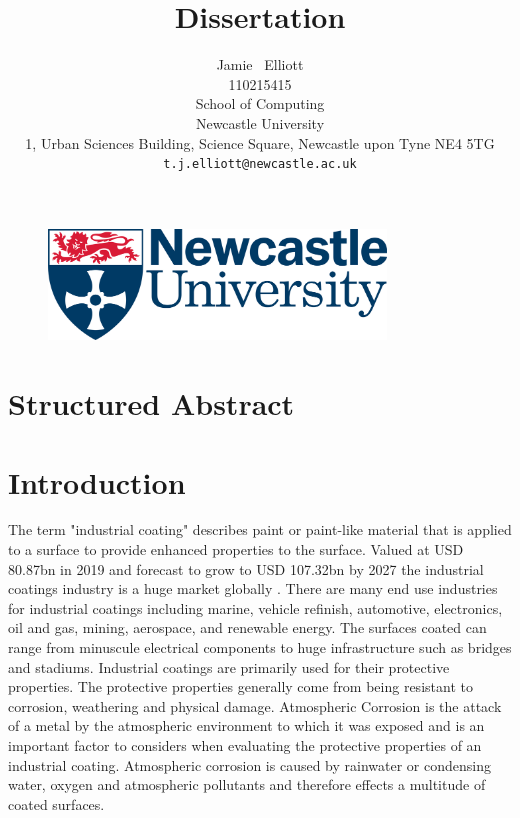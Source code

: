 \documentclass{article}
\title{Dissertation}
\author{
  Jamie ~Elliott \\
  110215415\\
  School of Computing\\
  Newcastle University\\
 1, Urban Sciences Building, Science Square, Newcastle upon Tyne NE4 5TG \\
  \texttt{t.j.elliott@newcastle.ac.uk} \\
}
\begin{document}
\begin{figure}[h]
    \centering
    \includegraphics[width=0.8\textwidth]{Newcastle_University_logo.png}
\end{figure}
\maketitle

\newpage
\section{Structured Abstract}

\section{Introduction}
The term "industrial coating" describes paint or paint-like material that is applied to a surface to provide enhanced properties to the surface. Valued at USD 80.87bn in 2019 and forecast to grow to USD 107.32bn by 2027 the industrial coatings industry is a huge market globally \citep{IndustrialCoatings2020}. There are many end use industries for industrial coatings including marine, vehicle refinish, automotive, electronics, oil and gas, mining, aerospace, and renewable energy.  The surfaces coated can range from minuscule electrical components to huge infrastructure such as bridges and stadiums. Industrial coatings are primarily used for their protective properties. The protective properties generally come from being resistant to corrosion, weathering and physical damage. Atmospheric Corrosion is the attack of a metal by the atmospheric environment to which it was exposed \citep{DelaFuente2011} and is an important factor to considers when evaluating the protective properties of an industrial coating. Atmospheric corrosion is caused by rainwater or condensing water, oxygen and atmospheric pollutants \citep{LeBozec2015} and therefore effects a multitude of coated surfaces. 
\end{document}
